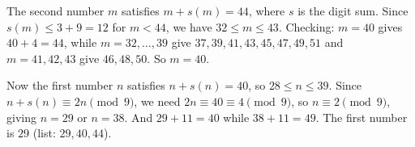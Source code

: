 The second number $m$ satisfies $m+s(m)=44$, where $s$ is the digit sum. Since $s(m)\le 3+9=12$ for $m<44$, we have $32\le m\le43$. Checking: $m=40$ gives $40+4=44$, while $m=32,\dots,39$ give $37,39,41,43,45,47,49,51$ and $m=41,42,43$ give $46,48,50$. So $m=40$.

Now the first number $n$ satisfies $n+s(n)=40$, so $28\le n\le39$. Since $n+s(n)\equiv 2n\pmod 9$, we need $2n\equiv40\equiv4\pmod9$, so $n\equiv2\pmod9$, giving $n=29$ or $n=38$. And $29+11=40$ while $38+11=49$. The first number is $\boxed{29}$ (list: $29,40,44$).
